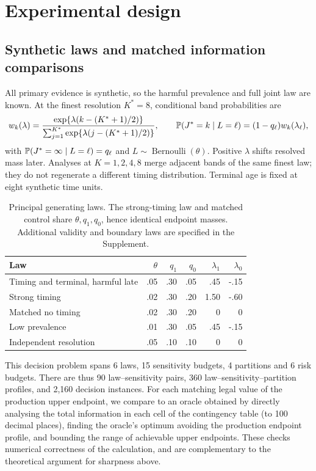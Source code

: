 \section{Experimental design}\label{sec:design}
\subsection{Synthetic laws and matched information comparisons}
All primary evidence is synthetic, so the harmful prevalence and full joint law are known. At the finest resolution $K^*=8$, conditional band probabilities are
\begin{equation}\label{eq:law}
 w_k(\lambda)=\frac{\exp\{\lambda(k-(K^*+1)/2)\}}
 {\sum_{j=1}^{K^*}\exp\{\lambda(j-(K^*+1)/2)\}},\qquad
 \mathbb P(J^*=k\mid L=\ell)=(1-q_\ell)w_k(\lambda_\ell),
\end{equation}
with $\mathbb P(J^*=\infty\mid L=\ell)=q_\ell$ and $L\sim\operatorname{Bernoulli}(\theta)$. Positive $\lambda$ shifts resolved mass later. Analyses at $K=1,2,4,8$ merge adjacent bands of the same finest law; they do not regenerate a different timing distribution. Terminal age is fixed at eight synthetic time units.

\begin{table}[!htbp]\centering
\caption{Principal generating laws. The strong-timing law and matched control share $\theta,q_1,q_0$, hence identical endpoint masses. Additional validity and boundary laws are specified in the Supplement.}\label{tab:laws}
\begin{tabular}{lrrrrr}\toprule
Law & $\theta$ & $q_1$ & $q_0$ & $\lambda_1$ & $\lambda_0$\\\midrule
Timing and terminal, harmful late & .05 & .30 & .05 & .45 & -.15\\
Strong timing & .02 & .30 & .20 & 1.50 & -.60\\
Matched no timing & .02 & .30 & .20 & 0 & 0\\
Low prevalence & .01 & .30 & .05 & .45 & -.15\\
Independent resolution & .05 & .10 & .10 & 0 & 0\\\bottomrule
\end{tabular}
\end{table}

This decision problem spans 6 laws, 15 sensitivity budgets, 4 partitions and 6 risk budgets. There are thus 90 law--sensitivity pairs, 360 law--sensitivity--partition profiles, and 2,160 decision instances. For each matching legal value of the production upper endpoint, we compare to an oracle obtained by directly analysing the total information in each cell of the contingency table (to 100 decimal places), finding the oracle's optimum avoiding the production endpoint profile, and bounding the range of achievable upper endpoints. These checks numerical correctness of the calculation, and are complementary to the theoretical argument for sharpness above.

